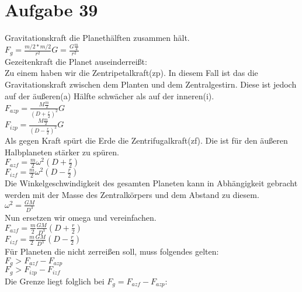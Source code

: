 \section{Aufgabe 39}
Gravitationskraft die Planethälften zusammen hält.\\
$F_g=\frac{m/2 * m/2}{r^2} G = \frac{G \frac{m}{4}}{r^2} $\\

Gezeitenkraft die Planet auseinderreißt:\\
Zu einem haben wir die Zentripetalkraft(zp). In diesem Fall ist das die Gravitationskraft zwischen dem Planten und dem Zentralgestirn. Diese ist jedoch auf der äußeren(a) Hälfte schwächer als auf der inneren(i). \\
$F_{azp} = \frac{M\frac{m}{2}}{(D+\frac{r}{2})^2}G $\\
$F_{izp} = \frac{M\frac{m}{2}}{(D-\frac{r}{2})^2}G $\\
Als gegen Kraft spürt die Erde die Zentrifugalkraft(zf). Die ist für den äußeren Halbplaneten stärker zu spüren.\\
$F_{azf} = \frac{m}{2}\omega^2(D + \frac{r}{2})$\\
$F_{izf} = \frac{m}{2}\omega^2(D - \frac{r}{2})$\\

Die Winkelgeschwindigkeit des gesamten Planeten kann in Abhängigkeit gebracht werden mit der Masse des Zentralkörpers und dem Abstand zu diesem.\\
$\omega^2 = \frac{G M}{D^3}$\\
Nun ersetzen wir omega und vereinfachen.\\
$F_{azf} = \frac{m}{2}\frac{G M}{D^3}(D + \frac{r}{2})$\\
$F_{izf} = \frac{m}{2}\frac{G M}{D^3}(D - \frac{r}{2})$\\

Für Planeten die nicht zerreißen soll, muss folgendes gelten:\\
$F_g > F_{azf} - F_{azp}$\\
$F_g > F_{izp} - F_{izf}$\\

Die Grenze liegt folglich bei $F_g = F_{azf} - F_{azp}$:\\


